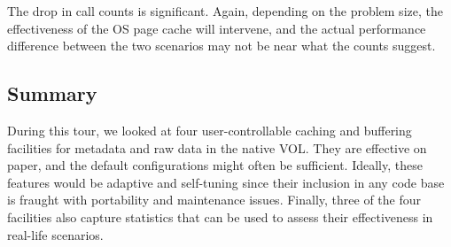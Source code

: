 The drop in call counts is significant. Again, depending on the problem size, the effectiveness of the OS page cache will intervene, and the actual performance difference between the two scenarios may not be near what the counts suggest.

\subsection{Summary}

During this tour, we looked at four user-controllable caching and buffering facilities for metadata and raw data in the native VOL. They are effective on paper, and the default configurations might often be sufficient. Ideally, these features would be adaptive and self-tuning since their inclusion in any code base is fraught with portability and maintenance issues. Finally, three of the four facilities also capture statistics that can be used to assess their effectiveness in real-life scenarios.

